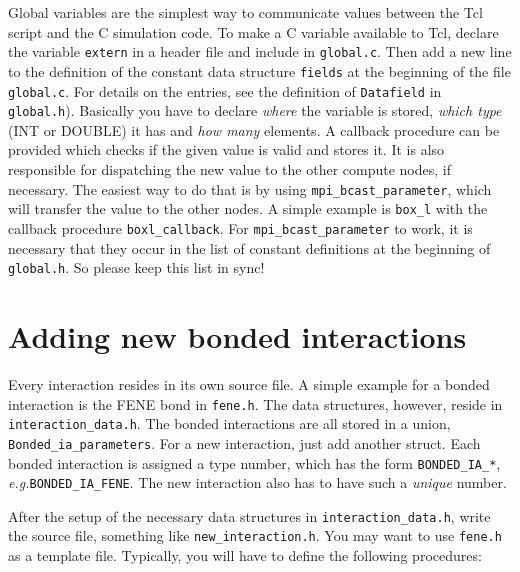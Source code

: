 \documentclass[
a4paper,                        %
11pt,                           %
twoside,                        %
footsepline,                    %
headsepline,                    %
headexclude,                    %
footexclude,                    %
pagesize,                       %
bibtotocnumbered,               %
idxtotoc                        %
]{scrreprt}
\newcommand{\eg}{\textit{e.g.}\xspace}
\begin{document}
Global variables are the simplest way to communicate values between
the Tcl script and the C simulation code.  To make a C variable
available to Tcl, declare the variable \texttt{extern} in a header
file and include in \texttt{global.c}. Then add a new line to the
definition of the constant data structure \texttt{fields} at the
beginning of the file \texttt{global.c}. For details on the entries,
see the definition of \texttt{Datafield} in
\texttt{global.h}). Basically you have to declare \emph{where} the
variable is stored, \emph{which type} (INT or DOUBLE) it has and
\emph{how many} elements. A callback procedure can be provided which
checks if the given value is valid and stores it. It is also
responsible for dispatching the new value to the other compute nodes,
if necessary. The easiest way to do that is by using
\verb!mpi_bcast_parameter!, which will transfer the value to the other
nodes. A simple example is \verb!box_l! with the callback procedure
\verb!boxl_callback!. For \verb!mpi_bcast_parameter! to work, it is
necessary that they occur in the list of constant definitions at the
beginning of \texttt{global.h}.  So please keep this list in sync!

\section{Adding new bonded interactions}

Every interaction resides in its own source file. A simple example for
a bonded interaction is the FENE bond in \texttt{fene.h}. The data
structures, however, reside in \texttt{interaction\_data.h}.  The
bonded interactions are all stored in a union,
\verb!Bonded_ia_parameters!. For a new interaction, just add another
struct. Each bonded interaction is assigned a type number, which has
the form \verb!BONDED_IA_*!, \eg \verb!BONDED_IA_FENE!. The new
interaction also has to have such a \emph{unique} number.
	
After the setup of the necessary data structures in
\verb!interaction_data.h!, write the source file, something like
\verb!new_interaction.h!. You may want to use \verb!fene.h! as a
template file.  Typically, you will have to define the following
procedures:
\end{document}
